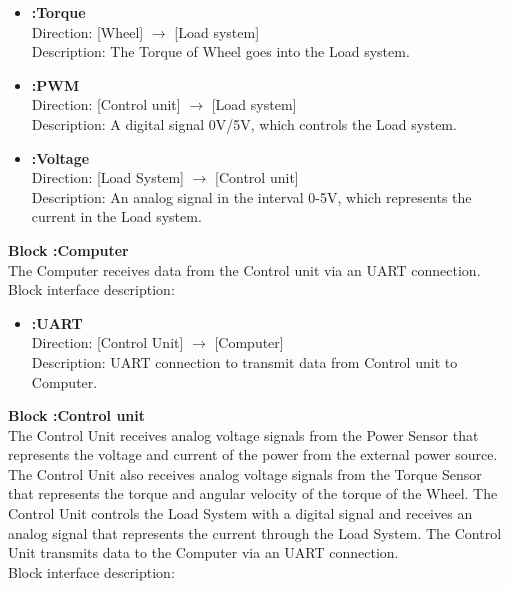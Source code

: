 \begin{itemize}
	\item \textbf{:Torque}\\
		Direction: [Wheel] $\rightarrow$ [Load system]\\
		Description: The Torque of Wheel goes into the Load system.
	\item \textbf{:PWM}\\
		Direction: [Control unit] $\rightarrow$ [Load system]\\
		Description: A digital signal 0V/5V, which controls the Load system.
	\item \textbf{:Voltage}\\
		Direction: [Load System] $\rightarrow$ [Control unit]\\
		Description: An analog signal in the interval 0-5V, which represents the current in the Load system.
\end{itemize}

\textbf{Block :Computer}\\
The Computer receives data from the Control unit via an UART connection.\\
Block interface description:

\begin{itemize}
	\item \textbf{:UART}\\
		Direction: [Control Unit] $\rightarrow$ [Computer]\\
		Description: UART connection to transmit data from Control unit to Computer.
\end{itemize}

\textbf{Block :Control unit}\\
The Control Unit receives analog voltage signals from the Power Sensor that represents the voltage and current of the power from the external power source. The Control Unit also receives analog voltage signals from the Torque Sensor that represents the torque and angular velocity of the torque of the Wheel. The Control Unit controls the Load System with a digital signal and receives an analog signal that represents the current through the Load System. The Control Unit transmits data to the Computer via an UART connection.\\
Block interface description:

